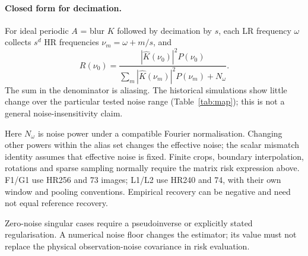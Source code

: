 \paragraph{Closed form for decimation.} For ideal periodic $A$ = blur $K$ followed by
decimation by $s$, each LR frequency $\omega$ collects $s^d$ HR frequencies
$\nu_m=\omega+m/s$, and
\begin{equation}\label{eq:alias}
R(\nu_0)=\frac{|\hat K(\nu_0)|^2P(\nu_0)}{\sum_m|\hat K(\nu_m)|^2P(\nu_m)+N_\omega}.
\end{equation}
The sum in the denominator is aliasing. The historical simulations show little change over the particular tested noise range (Table~\ref{tab:map}); this is not a general noise-insensitivity claim.

Here $N_\omega$ is noise power under a compatible Fourier normalisation.
Changing other powers within the alias set changes the effective noise;
the scalar mismatch identity assumes that effective noise is fixed.
Finite crops, boundary interpolation, rotations and sparse sampling
normally require the matrix risk expression above. F1/G1 use HR256 and 73 images;
L1/L2 use HR240 and 74, with their own window and pooling conventions.
Empirical recovery can be negative and need not equal reference recovery.

Zero-noise singular cases require a pseudoinverse or explicitly stated
regularisation. A numerical noise floor changes the estimator; its value
must not replace the physical observation-noise covariance in risk evaluation.


